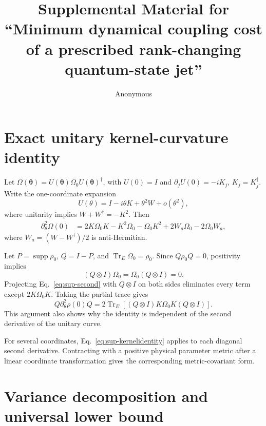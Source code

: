 \documentclass[aps,pra,preprint,nofootinbib]{revtex4-2}
\newcommand{\Tr}{\operatorname{Tr}}
\newcommand{\supp}{\operatorname{supp}}
\newcommand{\rhozero}{\rho_0}
\newcommand{\Omegazero}{\Omega_0}
\begin{document}
\title{Supplemental Material for ``Minimum dynamical coupling cost of a prescribed rank-changing quantum-state jet''}
\author{Anonymous}
\maketitle

\section{Exact unitary kernel-curvature identity}

Let $\Omega(\bm\theta)=U(\bm\theta)\Omegazero U(\bm\theta)^\dagger$, with $U(0)=I$ and $\partial_jU(0)=-iK_j$, $K_j=K_j^\dagger$. Write the one-coordinate expansion
\begin{equation}
 U(\theta)=I-i\theta K+\theta^2 W+o(\theta^2),
\end{equation}
where unitarity implies $W+W^\dagger=-K^2$. Then
\begin{align}
 \partial_\theta^2\Omega(0)
 &=2K\Omegazero K-K^2\Omegazero-\Omegazero K^2
 +2W_a\Omegazero-2\Omegazero W_a,
 \label{eq:sup-second}
\end{align}
where $W_a=(W-W^\dagger)/2$ is anti-Hermitian.

Let $P=\supp\rhozero$, $Q=I-P$, and $\Tr_E\Omegazero=\rhozero$. Since $Q\rhozero Q=0$, positivity implies
\begin{equation}
 (Q\otimes I)\Omegazero=\Omegazero(Q\otimes I)=0.
 \label{eq:sup-support}
\end{equation}
Projecting Eq.~\eqref{eq:sup-second} with $Q\otimes I$ on both sides eliminates every term except $2K\Omegazero K$. Taking the partial trace gives
\begin{equation}
 Q\partial_\theta^2\rho(0)Q
 =2\Tr_E[(Q\otimes I)K\Omegazero K(Q\otimes I)].
 \label{eq:sup-kernelidentity}
\end{equation}
This argument also shows why the identity is independent of the second derivative of the unitary curve.

For several coordinates, Eq.~\eqref{eq:sup-kernelidentity} applies to each diagonal second derivative. Contracting with a positive physical parameter metric after a linear coordinate transformation gives the corresponding metric-covariant form.

\section{Variance decomposition and universal lower bound}
\end{document}
